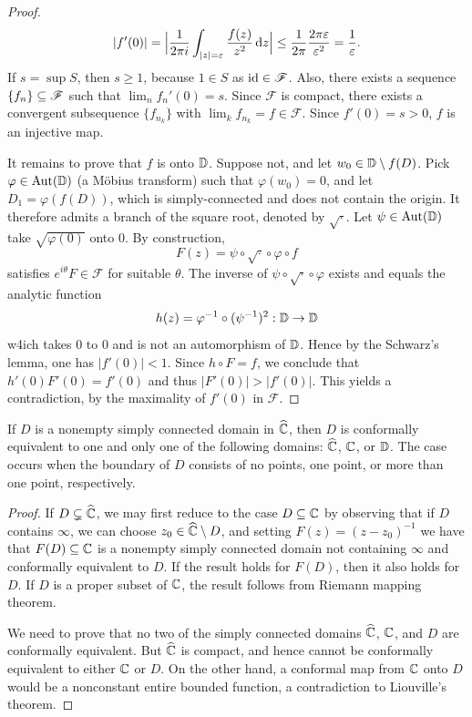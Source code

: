 \begin{proof}
\[|f'(0)|=\Big|\frac{1}{2\pi i}\int_{|z|=\varepsilon}\frac{f(z)}{z^2}\mathop{}\!\mathrm{d} z\Big|\leq\frac{1}{2\pi}\frac{2\pi\varepsilon}{\varepsilon^2}=\frac{1}{\varepsilon}.\]
If $s=\sup S$, then $s\geq 1$, because $1\in S$ as $\mathrm{id}\in\mathscr{F}$. Also, there exists a sequence $\{f_n\}\subseteq\mathscr{F}$ such that $\lim_{n}f_n'(0)=s$. Since $\mathscr{F}$ is compact, there exists a convergent subsequence $\{f_{n_k}\}$ with $\lim_kf_{n_k}=f\in\mathscr{F}$. Since $f'(0)=s>0$, $f$ is an injective map.\par
It remains to prove that $f$ is onto $\mathbb{D}$. Suppose not, and let $w_0\in\mathbb{D}\setminus f(D)$. Pick $\varphi\in\mathrm{Aut}(\mathbb{D})$ (a M\"obius transform) such that $\varphi(w_0)=0$, and let $D_1=\varphi(f(D))$, which is simply-connected and does not contain the origin. It therefore admits a branch of the square root, denoted by $\sqrt{\cdot}$. Let $\psi\in\mathrm{Aut}(\mathbb{D})$ take $\sqrt{\varphi(0)}$ onto $0$. By construction,
\[F(z)=\psi\circ\sqrt{\cdot}\circ\varphi\circ f\]
satisfies $e^{i\theta}F\in\mathscr{F}$ for suitable $\theta$. The inverse of $\psi\circ\sqrt{\cdot}\circ\varphi$ exists and equals the analytic function
\[h(z)=\varphi^{-1}\circ(\psi^{-1})^2:\mathbb{D}\to\mathbb{D}\]
w4ich takes $0$ to $0$ and is not an automorphism of $\mathbb{D}$. Hence by the Schwarz's lemma, one has $|f'(0)|<1$. Since $h\circ F=f$, we conclude that $h'(0)F'(0)=f'(0)$ and thus $|F'(0)|>|f'(0)|$. This yields a contradiction, by the maximality of $f'(0)$ in $\mathscr{F}$.
\end{proof}
\begin{corollary}
If $D$ is a nonempty simply connected domain in $\widehat{\mathbb{C}}$, then $D$ is conformally equivalent to one and only one of the following domains: $\widehat{\mathbb{C}}$, $\mathbb{C}$, or $\mathbb{D}$. The case occurs when the boundary of $D$ consists of no points, one point, or more than one point, respectively.
\end{corollary}
\begin{proof}
If $D\subsetneq\widehat{\mathbb{C}}$, we may first reduce to the case $D\subseteq\mathbb{C}$ by observing that if $D$ contains $\infty$, we can choose $z_0\in\widehat{\mathbb{C}}\setminus D$, and setting $F(z)=(z-z_0)^{-1}$ we have that $F(D)\subseteq\mathbb{C}$ is a nonempty simply connected domain not containing $\infty$ and conformally equivalent to $D$. If the result holds for $F(D)$, then it also holds for $D$. If $D$ is a proper subset of $\mathbb{C}$, the result follows from Riemann mapping theorem.\par
We need to prove that no two of the simply connected domains $\widehat{\mathbb{C}}$, $\mathbb{C}$, and $D$ are conformally equivalent. But $\widehat{\mathbb{C}}$ is compact, and hence cannot be conformally equivalent to either $\mathbb{C}$ or $D$. On the other hand, a conformal map from $\mathbb{C}$ onto $D$ would be a nonconstant entire bounded function, a contradiction to Liouville's theorem.
\end{proof}
